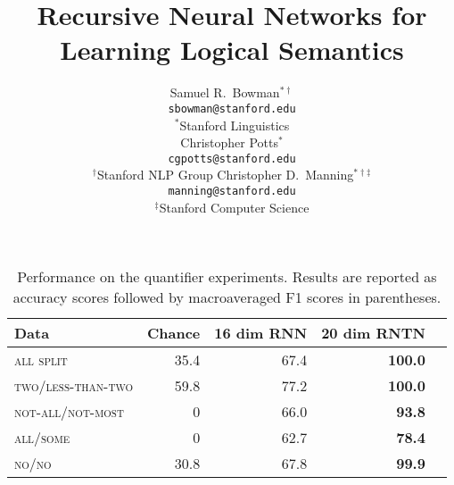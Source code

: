 \documentclass{article} %
\title{Recursive Neural Networks for Learning Logical Semantics}
\author{
Samuel R.\ Bowman$^{\ast\dag}$ \\
\texttt{sbowman@stanford.edu} \\[2ex]
$^{\ast}$Stanford Linguistics \\
\And
Christopher Potts$^{\ast}$\\
\texttt{cgpotts@stanford.edu} \\[2ex]
$^{\dag}$Stanford NLP Group
\And
Christopher D.\ Manning$^{\ast\dag\ddag}$\\
\texttt{manning@stanford.edu}\\[2ex]
$^{\ddag}$Stanford Computer Science
}
\def\ii#1{\textit{#1}}
\begin{document}
\begin{table}[tp]
  \centering
  \setlength{\tabcolsep}{10pt}
  \begin{tabular}{ l rr r r }
    \toprule
    Data & \multicolumn{1}{c}{Chance} & \multicolumn{1}{c}{16 dim RNN}  & \multicolumn{1}{c}{20 dim RNTN}\\
    \midrule
    \textsc{all split}              & 35.4  &  67.4& \textbf{100.0} 
    \\[1ex]    
    \textsc{two/less-than-two} & 59.8 & 77.2  &  \textbf{100.0}  \\
    \textsc{not-all/not-most}  &    0    & 66.0  &  \textbf{93.8}   \\
    \textsc{all/some}      &    0   & 62.7   & \textbf{78.4}  \\
    \textsc{no/no}             & 30.8  & 67.8  &  \textbf{99.9}   \\
    \bottomrule
  \end{tabular}
  \caption{Performance on the quantifier experiments. Results are reported as accuracy scores followed by macroaveraged F1 scores in parentheses.}
  \label{resultstable}
\end{table} 


\begin{figure}[hp]
  \centering\resizebox{4.5in}{!}{
  }
  \label{sample-figure}
\end{figure}
\end{document}

